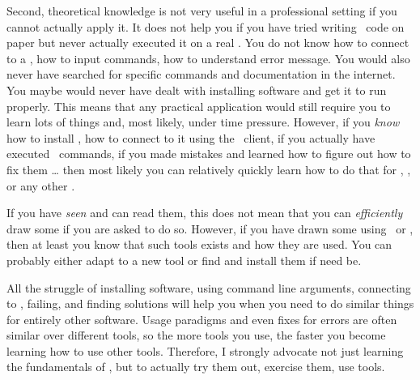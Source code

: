 Second, theoretical knowledge is not very useful in a professional setting if you cannot actually apply it.
It does not help you if you have tried writing \sql\ code on paper but never actually executed it on a real \dbms.
You do not know how to connect to a \dbms, how to input commands, how to understand error message.
You would also never have searched for specific commands and documentation in the internet.
You maybe would never have dealt with installing software and get it to run properly.
This means that any practical application would still require you to learn lots of things and, most likely, under time pressure.
However, if you \emph{know} how to install \postgresql, how to connect to it using the \psql\ client, if you actually have executed \sql\ commands, if you made mistakes and learned how to figure out how to fix them {\dots} then most likely you can relatively quickly learn how to do that for \mysql, \mariadb, or any other \dbms.

If you have \emph{seen}  and can read them, this does not mean that you can \emph{efficiently} draw some if you are asked to do so.
However, if you have drawn some using \yEd\ or \pgmodeler, then at least you know that such tools exists and how they are used.
You can probably either adapt to a new tool or find and install them if need be.

All the struggle of installing software, using command line arguments, connecting  to , failing, and finding solutions will help you when you need to do similar things for entirely other software.
Usage paradigms and even fixes for errors are often similar over different tools, so the more tools you use, the faster you become learning how to use other tools.
Therefore, I strongly advocate not just learning the fundamentals of , but to actually try them out, exercise them, use tools.

